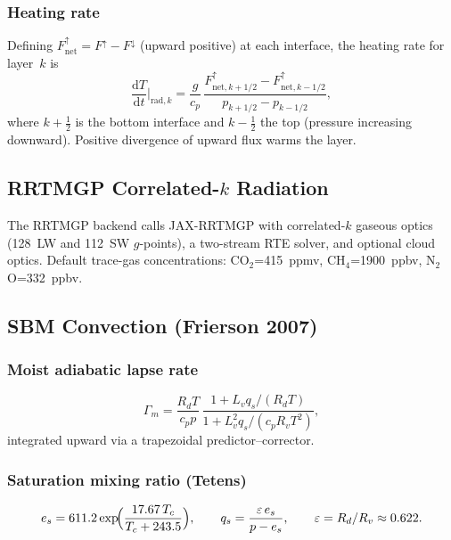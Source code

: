 \documentclass[11pt,a4paper]{article}
\newcommand{\dd}{\mathrm{d}}
\newcommand{\half}{\tfrac{1}{2}}
\newcommand{\Rd}{R_d}
\newcommand{\cpd}{c_p}
\newcommand{\Lv}{L_v}
\newcommand{\Rv}{R_v}
\begin{document}
\subsubsection{Heating rate}
Defining $F_{\mathrm{net}}^\uparrow=F^\uparrow-F^\downarrow$ (upward positive) at each interface, the heating rate for layer~$k$ is
\begin{equation}
  \frac{\dd T}{\dd t}\bigg|_{\mathrm{rad},k} = \frac{g}{\cpd}\,\frac{F_{\mathrm{net},k+1/2}^\uparrow-F_{\mathrm{net},k-1/2}^\uparrow}{p_{k+1/2}-p_{k-1/2}},
\end{equation}
where $k+\half$ is the bottom interface and $k-\half$ the top (pressure increasing downward).  Positive divergence of upward flux warms the layer.

\subsection{RRTMGP Correlated-$k$ Radiation}

The RRTMGP backend calls JAX-RRTMGP with correlated-$k$ gaseous optics (128~LW and 112~SW $g$-points), a two-stream RTE solver, and optional cloud optics.  Default trace-gas concentrations: CO$_2$=415~ppmv, CH$_4$=1900~ppbv, N$_2$O=332~ppbv.

\subsection{SBM Convection (Frierson 2007)}

\subsubsection{Moist adiabatic lapse rate}
\begin{equation}
  \Gamma_m = \frac{\Rd T}{\cpd p}\,\frac{1+\Lv q_s/(\Rd T)}{1+\Lv^2 q_s/(\cpd\Rv T^2)},
\end{equation}
integrated upward via a trapezoidal predictor--corrector.

\subsubsection{Saturation mixing ratio (Tetens)}
\begin{equation}
  e_s = 611.2\exp\!\Bigl(\frac{17.67\,T_c}{T_c+243.5}\Bigr), \qquad
  q_s = \frac{\varepsilon\,e_s}{p-e_s}, \qquad \varepsilon=\Rd/\Rv\approx 0.622.
\end{equation}
\end{document}

